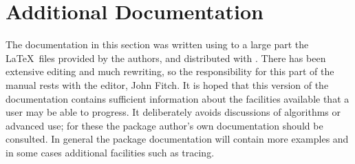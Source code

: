 
\newcommand{\s}[1] {$<${\em #1}$>$}


\renewcommand{\k}[1] {{\bf #1}}

\newcommand{\f}[1] {{\tt #1}}

\newcommand{\example}{\refstepcounter{examplectr}
\noindent{\bf Example \theexamplectr}}

\part{Additional {\REDUCE} Documentation}
\setcounter{examplectr}{0}

The documentation in this section was written using to a large part
the \LaTeX\ files provided by the authors, and distributed with
\REDUCE.  There has been extensive editing and much rewriting, so
the responsibility for this part of the manual rests with the editor,
John Fitch.  It is hoped that this version of the documentation
contains sufficient information about the facilities available that a
user may be able to progress.  It deliberately avoids discussions of
algorithms or advanced use; for these the package author's own
documentation should be consulted.  In general the package
documentation will contain more examples and in some cases additional
facilities such as tracing.


